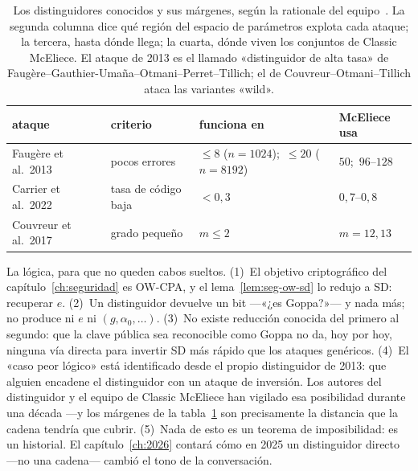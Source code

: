 \begin{table}[htbp]
\centering
\footnotesize
\setlength{\tabcolsep}{6pt}
\begin{tabular}{llll}
\toprule
ataque & criterio & funciona en & McEliece usa\\
\midrule
Faugère et al.\ 2013~\cite{faugere2013} & pocos errores &
  $\le 8$ ($n=1024$);\ $\le 20$ ($n=8192$) & $50$;\ $96$--$128$\\
Carrier et al.\ 2022~\cite{carrier2022} & tasa de código baja &
  $<0{,}3$ & $0{,}7$--$0{,}8$\\
Couvreur et al.\ 2017~\cite{couvreur2017} & grado pequeño &
  $m\le 2$ & $m=12,13$\\
\bottomrule
\end{tabular}
\caption{Los distinguidores conocidos y sus márgenes, según la
rationale del equipo~\cite{cmrationale}. La segunda columna dice qué
región del espacio de parámetros explota cada ataque; la tercera,
hasta dónde llega; la cuarta, dónde viven los conjuntos de Classic
McEliece. El ataque de 2013 es el llamado «distinguidor de alta
tasa» de Faugère--Gauthier-Umaña--Otmani--Perret--Tillich; el de
Couvreur--Otmani--Tillich ataca las variantes «wild».}
\label{tab:est-margenes}
\end{table}

\begin{rigor}
La lógica, para que no queden cabos sueltos. (1)~El objetivo
criptográfico del capítulo~\ref{ch:seguridad} es OW-CPA, y el
lema~\ref{lem:seg-ow-sd} lo redujo a SD: recuperar $e$. (2)~Un
distinguidor devuelve un bit ---«¿es Goppa?»--- y nada más; no
produce ni $e$ ni $(g,\alpha_0,\dots)$. (3)~No existe reducción
conocida del primero al segundo: que la clave pública sea
reconocible como Goppa no da, hoy por hoy, ninguna vía directa para
invertir SD más rápido que los ataques genéricos. (4)~El «caso
peor lógico» está identificado desde el propio distinguidor de
2013: que alguien encadene el distinguidor con un ataque de
inversión. Los autores del distinguidor y el equipo de Classic
McEliece han vigilado esa posibilidad durante una década ---y los
márgenes de la tabla~\ref{tab:est-margenes} son precisamente la
distancia que la cadena tendría que cubrir. (5)~Nada de esto es un
teorema de imposibilidad: es un historial. El capítulo~\ref{ch:2026}
contará cómo en 2025 un distinguidor directo ---no una cadena---
cambió el tono de la conversación.
\end{rigor}

